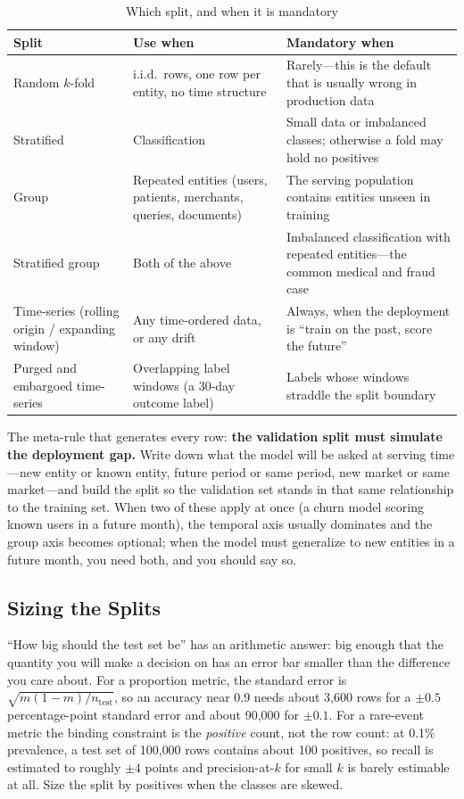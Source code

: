 \begin{table}[H]
\centering
\small
\caption{Which split, and when it is mandatory}
\label{cml:tab:split_choice}
\begin{tabularx}{\textwidth}{lXX}
\toprule
\textbf{Split} & \textbf{Use when} & \textbf{Mandatory when} \\
\midrule
Random $k$-fold & i.i.d.\ rows, one row per entity, no time structure & Rarely---this is the default that is usually wrong in production data \\
Stratified & Classification & Small data or imbalanced classes; otherwise a fold may hold no positives \\
Group & Repeated entities (users, patients, merchants, queries, documents) & The serving population contains entities unseen in training \\
Stratified group & Both of the above & Imbalanced classification with repeated entities---the common medical and fraud case \\
Time-series (rolling origin / expanding window) & Any time-ordered data, or any drift & Always, when the deployment is ``train on the past, score the future'' \\
Purged and embargoed time-series & Overlapping label windows (a 30-day outcome label) & Labels whose windows straddle the split boundary \\
\bottomrule
\end{tabularx}
\end{table}

The meta-rule that generates every row: \textbf{the validation split must simulate the deployment gap.} Write down what the model will be asked at serving time---new entity or known entity, future period or same period, new market or same market---and build the split so the validation set stands in that same relationship to the training set. When two of these apply at once (a churn model scoring known users in a future month), the temporal axis usually dominates and the group axis becomes optional; when the model must generalize to new entities in a future month, you need both, and you should say so.

\subsection{Sizing the Splits}

``How big should the test set be'' has an arithmetic answer: big enough that the quantity you will make a decision on has an error bar smaller than the difference you care about. For a proportion metric, the standard error is $\sqrt{m(1-m)/n_{\text{test}}}$, so an accuracy near 0.9 needs about 3{,}600 rows for a $\pm 0.5$ percentage-point standard error and about 90{,}000 for $\pm 0.1$. For a rare-event metric the binding constraint is the \emph{positive} count, not the row count: at 0.1\% prevalence, a test set of 100{,}000 rows contains about 100 positives, so recall is estimated to roughly $\pm 4$ points and precision-at-$k$ for small $k$ is barely estimable at all. Size the split by positives when the classes are skewed.

